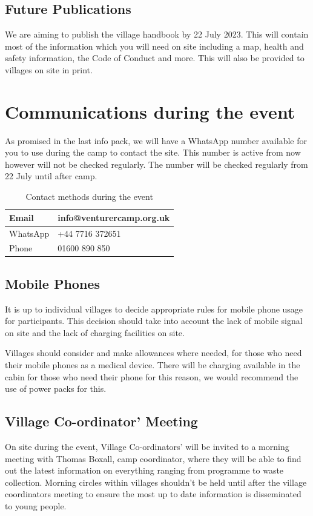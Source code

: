 \documentclass[a4paper, 11pt]{report}
\newcommand{\nl}{\newline}
\begin{document}
\section{Future Publications}
We are aiming to publish the village handbook by 22 July 2023. This will contain most of the information which you will need on site including a map, health and safety information, the Code of Conduct and more. This will also be provided to villages on site in print.

\chapter{Communications during the event}
As promised in the last info pack, we will have a WhatsApp number available for you to use during the camp to contact the site. This number is active from now however will not be checked regularly. The number will be checked regularly from 22 July until after camp.
\begin{table}[H]
    \centering
    \begin{tabular}{p{} p{}}
        \hline
        Email & info@venturercamp.org.uk\\
        \hline
        WhatsApp & +44 7716 372651\\
        \hline
        Phone & 01600 890 850\\
        \hline
    \end{tabular}
    \caption{Contact methods during the event}
\end{table}

\section{Mobile Phones}
It is up to individual villages to decide appropriate rules for mobile phone usage for participants. This decision should take into account the lack of mobile signal on site and the lack of charging facilities on site.\nl

Villages should consider and make allowances where needed, for those who need their mobile phones as a medical device. There will be charging available in the cabin for those who need their phone for this reason, we would recommend the use of power packs for this. 

\section{Village Co-ordinator' Meeting}
On site during the event, Village Co-ordinators' will be invited to a morning meeting with Thomas Boxall, camp coordinator, where they will be able to find out the latest information on everything ranging from programme to waste collection. Morning circles within villages shouldn't be held until after the village coordinators meeting to ensure the most up to date information is disseminated to young people. 
\end{document}
